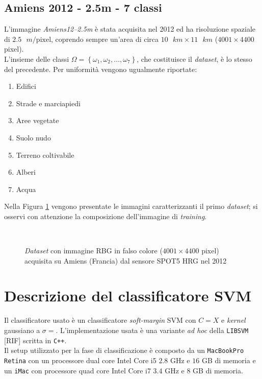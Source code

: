 \subsection{Amiens 2012 - 2.5m - 7 classi}
L'immagine \emph{Amiens12--2.5m} è stata acquisita nel 2012 ed ha  risoluzione spaziale di $2.5\text{ }m/\text{pixel}$, coprendo sempre un'area di circa $10\text{ }km\times11\text{ }km$ ($4001\times4400$ pixel).\\
L'insieme delle classi $\Omega=\left\lbrace\omega_1,\omega_2,\ldots,\omega_{7}\right\rbrace$, che costituisce il \emph{dataset}, è lo stesso del precedente. Per uniformità vengono ugualmente riportate:
\begin{enumerate}
\item Edifici
\item Strade e marciapiedi
\item Aree vegetate
\item Suolo nudo
\item Terreno coltivabile
\item Alberi
\item Acqua
\end{enumerate}
Nella Figura \ref{fig: Amiens122_5m} vengono presentate le immagini caratterizzanti il primo \emph{dataset}; si osservi con attenzione la composizione dell'immagine di \emph{training}.
\clearpage
\begin{figure}[!ht]
   \center
   \\%
     \hspace{4mm}
    \caption{\emph{Dataset} con immagine RBG in falso colore ($4001\times4400$ pixel) acquisita su Amiens (Francia) dal sensore \textsc{SPOT5 HRG} nel 2012}
    \label{fig: Amiens122_5m}
  \end{figure}
\clearpage

\section{Descrizione del classificatore SVM}
Il classificatore usato è un classificatore \emph{soft-margin} SVM con $C=X$ e \emph{kernel} gaussiano a $\sigma = $. L'implementazione usata è una variante \emph{ad hoc} della \texttt{LIBSVM} [RIF] scritta in \texttt{C++}.\\
Il setup utilizzato per la fase di classificazione è composto da un \texttt{MacBookPro Retina} con un processore dual core Intel Core i5 $2.8$ GHz e $16$ GB di memoria e un \texttt{iMac} con processore quad core Intel Core i7 $3.4$ GHz e $8$ GB di memoria. \\


